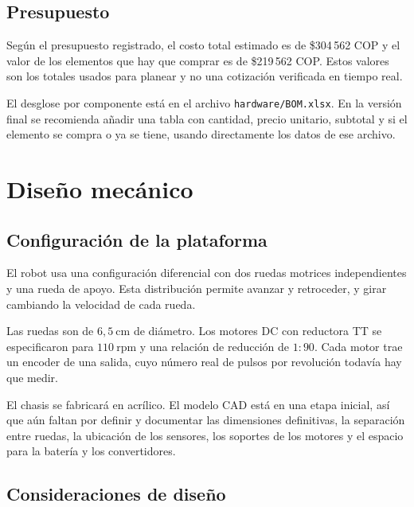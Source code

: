 \documentclass[journal]{IEEEtran}
\begin{document}
\subsection{Presupuesto}

Según el presupuesto registrado, el costo total estimado es de \$304\,562 COP y el valor de los elementos que hay que comprar es de \$219\,562 COP. Estos valores son los totales usados para planear y no una cotización verificada en tiempo real.

El desglose por componente está en el archivo \texttt{hardware/BOM.xlsx}. En la versión final se recomienda añadir una tabla con cantidad, precio unitario, subtotal y si el elemento se compra o ya se tiene, usando directamente los datos de ese archivo.


\section{Diseño mecánico}

\subsection{Configuración de la plataforma}

El robot usa una configuración diferencial con dos ruedas motrices independientes y una rueda de apoyo. Esta distribución permite avanzar y retroceder, y girar cambiando la velocidad de cada rueda.

Las ruedas son de $6{,}5~\mathrm{cm}$ de diámetro. Los motores DC con reductora TT se especificaron para $110~\mathrm{rpm}$ y una relación de reducción de $1:90$. Cada motor trae un encoder de una salida, cuyo número real de pulsos por revolución todavía hay que medir.

El chasis se fabricará en acrílico. El modelo CAD está en una etapa inicial, así que aún faltan por definir y documentar las dimensiones definitivas, la separación entre ruedas, la ubicación de los sensores, los soportes de los motores y el espacio para la batería y los convertidores.

\subsection{Consideraciones de diseño}
\end{document}
